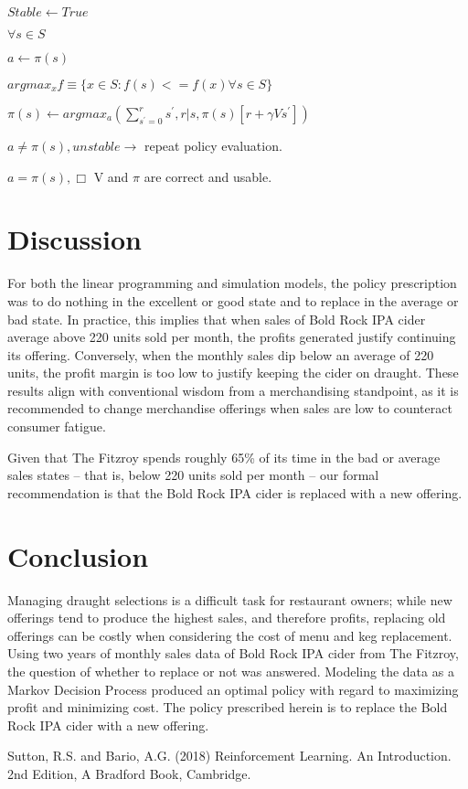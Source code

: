 \documentclass[conference]{IEEEtran}
\begin{document}
$Stable \leftarrow True$

$\forall s \in S$

$a \leftarrow \pi(s)$

$argmax_{x} f \equiv \{ x \in S: f(s) <= f(x) \forall s \in S \}$

$\pi(s) \leftarrow argmax_{a}(\sum_{s^{'}=0}^{r} s^{'}, r| s, \pi(s) [r + \gamma V s^{'}])$

$a \ne \pi(s), unstable \rightarrow$ repeat policy evaluation.

$a = \pi(s), \Box $ V and $\pi$ are correct and usable. 

\section{Discussion}
For both the linear programming and simulation models, the policy prescription was to do nothing in the excellent or good state and to replace in the average or bad state.  In practice, this implies that when sales of Bold Rock IPA cider average above 220 units sold per month, the profits generated justify continuing its offering.  Conversely, when the monthly sales dip below an average of 220 units, the profit margin is too low to justify keeping the cider on draught.  These results align with conventional wisdom from a merchandising standpoint, as it is recommended to change merchandise offerings when sales are low to counteract consumer fatigue.

Given that The Fitzroy spends roughly 65\% of its time in the bad or average sales states – that is, below 220 units sold per month – our formal recommendation is that the Bold Rock IPA cider is replaced with a new offering.




\section{Conclusion}
Managing draught selections is a difficult task for restaurant owners; while new offerings tend to produce the highest sales, and therefore profits, replacing old offerings can be costly when considering the cost of menu and keg replacement.  Using two years of monthly sales data of Bold Rock IPA cider from The Fitzroy, the question of whether to replace or not was answered.  Modeling the data as a Markov Decision Process produced an optimal policy with regard to maximizing profit and minimizing cost.  The policy prescribed herein is to replace the Bold Rock IPA cider with a new offering.

\begin{thebibliography}{00}
 Sutton, R.S. and Bario, A.G. (2018) Reinforcement Learning. An Introduction. 2nd Edition, A Bradford Book, Cambridge.
\end{thebibliography}
\vspace{12pt}
\end{document}

